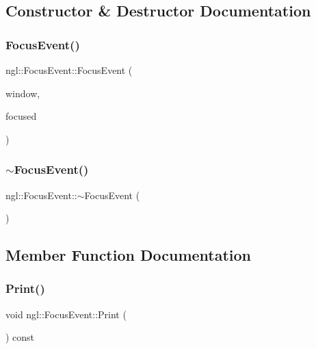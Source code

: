 \subsection{Constructor \& Destructor Documentation}
\mbox{\label{structngl_1_1_focus_event_a58d617d0e4daf05ad3cdfcebcacc9dd2}} 
\subsubsection{\texorpdfstring{Focus\+Event()}{FocusEvent()}}
{\footnotesize\ttfamily ngl\+::\+Focus\+Event\+::\+Focus\+Event (\begin{DoxyParamCaption}\item[{G\+L\+F\+Wwindow $\ast$}]{window,  }\item[{const bool}]{focused }\end{DoxyParamCaption})}

\mbox{\label{structngl_1_1_focus_event_a790ab4f30a2842da928ec47eddce3def}} 
\subsubsection{\texorpdfstring{$\sim$\+Focus\+Event()}{~FocusEvent()}}
{\footnotesize\ttfamily ngl\+::\+Focus\+Event\+::$\sim$\+Focus\+Event (\begin{DoxyParamCaption}{ }\end{DoxyParamCaption})}



\subsection{Member Function Documentation}
\mbox{\label{structngl_1_1_focus_event_ac04d96491d5498db4235618c7f4ffe80}} 
\subsubsection{\texorpdfstring{Print()}{Print()}}
{\footnotesize\ttfamily void ngl\+::\+Focus\+Event\+::\+Print (\begin{DoxyParamCaption}{ }\end{DoxyParamCaption}) const}



